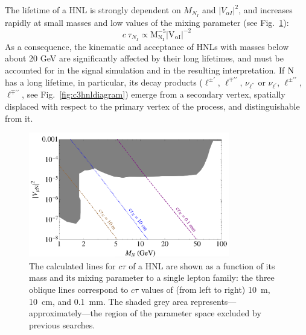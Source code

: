 The lifetime of a HNL is strongly dependent on $M_{N_I}$ and $|V_{\alpha I}|^2$,
and increases rapidly at small masses and low values of the mixing
parameter (see Fig.~\ref{fig:hnlLifetime}):
\begin{equation}
\label{eq:lifetimedependences}
c\:\tau_{N_{I}} \propto\mathrm{M_{N_I}^{-5}|V_{\alpha I}|^{-2}}
\end{equation}
As a consequence, the kinematic and acceptance of HNLs with masses
below about 20 GeV are significantly affected by their long lifetimes,
and must be accounted for in the signal simulation and in the resulting
interpretation.
If $\mathrm{N}$ has a long lifetime, in particular, its decay products
($\ell^{\pm\prime}$, $\ell^{\mp\prime\prime}$, $\nu_{\ell^{\prime\prime}}$ or
$\nu_{\ell^{\prime}}$, $\ell^{\pm\prime\prime}$, $\ell^{\mp\prime\prime}$, see Fig.~\ref{fig:c3hnldiagram})
emerge from a secondary vertex, spatially displaced with respect to
the primary vertex of the process, and distinguishable from it.
\begin{figure}
\centering
\includegraphics[width=0.78\textwidth]{Figures/c3/graph_displ.png}
\caption{The calculated lines for $c\tau$ of a HNL are shown as a function of its mass \mhnl
and its mixing parameter \mixpar to a single lepton family:
the three oblique lines correspond to $c\tau$ values of (from left to
right) 10~m,  10~cm, and 0.1~mm.
The shaded grey area represents---approximately---the region of the
parameter space excluded by previous searches.}
\label{fig:hnlLifetime}
\end{figure}


\vspace{5mm} 

